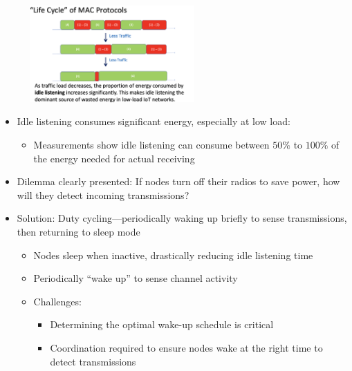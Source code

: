 \documentclass[10pt,landscape]{article}
\newcommand{\1}{\mathmybb{1}}
\begin{document}
\begin{multicols*}{3}
\includegraphics*[width=8.5cm, height=3.7cm]{images/maclifecycle.png}
\begin{itemize}
  \item Idle listening consumes significant energy, especially at low load:
  \begin{itemize}
    \item Measurements show idle listening can consume between $50\%$ to $100\%$ of the energy needed for actual receiving
  \end{itemize}
  \item Dilemma clearly presented: If nodes turn off their radios to save power, how will they detect incoming transmissions?
  \item Solution: Duty cycling—periodically waking up briefly to sense transmissions, then returning to sleep mode
  \begin{itemize}
    \item Nodes sleep when inactive, drastically reducing idle listening time
    \item Periodically “wake up” to sense channel activity
    \item Challenges:
    \begin{itemize}
      \item Determining the optimal wake-up schedule is critical
      \item Coordination required to ensure nodes wake at the right time to detect transmissions
    \end{itemize}
  \end{itemize}
\end{itemize}


\end{multicols*}
\end{document}

